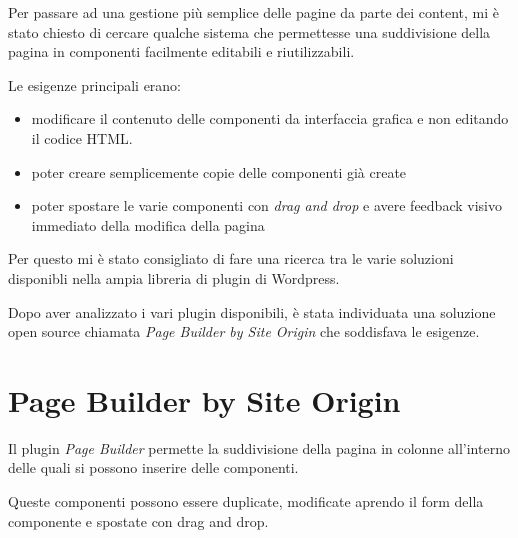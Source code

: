 


Per passare ad una gestione più semplice delle pagine da parte dei content,
mi è stato chiesto di cercare qualche sistema che permettesse una suddivisione
della pagina in componenti facilmente editabili e riutilizzabili.

Le esigenze principali erano:
\begin{itemize}
\item modificare il contenuto delle componenti da interfaccia grafica e non 
editando il codice HTML.
\item poter creare semplicemente copie delle componenti già create
\item poter spostare le varie componenti con \emph{drag and drop} e avere
feedback visivo immediato della modifica della pagina
\end{itemize}

Per questo mi è stato consigliato di fare una ricerca tra le varie soluzioni disponibli
nella ampia libreria di plugin di Wordpress.


Dopo aver analizzato i vari plugin disponibili, è stata individuata una soluzione open source chiamata \emph{Page Builder by
Site Origin}\cite{PB} che soddisfava le esigenze.

\section{Page Builder by Site Origin}

Il plugin \emph{Page Builder} permette la suddivisione della pagina in colonne all'interno delle quali
si possono inserire delle componenti.

Queste componenti possono essere duplicate, modificate aprendo il form della componente e spostate
con drag and drop.


